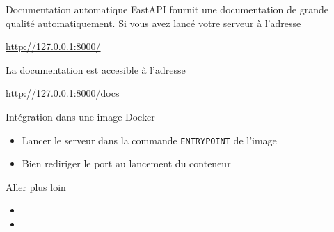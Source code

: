 \begin{frame}{Documentation automatique}
  FastAPI fournit une documentation de grande qualité automatiquement. Si vous avez lancé votre serveur à l'adresse

  \url{http://127.0.0.1:8000/}

  La documentation est accesible à l'adresse

  \url{http://127.0.0.1:8000/docs}
\end{frame}

\begin{frame}{Intégration dans une image Docker}
  \begin{itemize}
    \item Lancer le serveur dans la commande \texttt{ENTRYPOINT} de l'image
    \item Bien rediriger le port au lancement du conteneur
  \end{itemize}
\end{frame}

\begin{frame}{Aller plus loin}
  \begin{itemize}
    \item {}
    \item {}
  \end{itemize}
  
\end{frame}